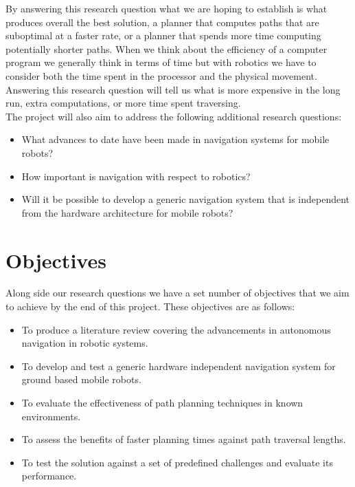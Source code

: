 \noindent
By answering this research question what we are hoping to establish is what produces overall the best solution, a planner that computes paths that are suboptimal at a faster rate, or a planner that spends more time computing potentially shorter paths. When we think about the efficiency of a computer program we generally think in terms of time but with robotics we have to consider both the time spent in the processor and the physical movement. Answering this research question will tell us what is more expensive in the long run, extra computations, or more time spent traversing. \\

\noindent
The project will also aim to address the following additional research questions:

\begin{itemize}
\item What advances to date have been made in navigation systems for mobile robots?

\item How important is navigation with respect to robotics?

\item Will it be possible to develop a generic navigation system that is independent from the hardware architecture for mobile robots?

\end{itemize}


\newpage

\section{Objectives}

\noindent
Along side our research questions we have a set number of objectives that we aim to achieve by the end of this project. These objectives are as follows:

\begin{itemize}
\item To produce a literature review covering the advancements in autonomous navigation in robotic systems.

\item To develop and test a generic hardware independent navigation system for ground based mobile robots. 

\item To evaluate the effectiveness of path planning techniques in known environments. 

\item To assess the benefits of faster planning times against path traversal lengths.

\item To test the solution against a set of predefined challenges and evaluate its performance.

\end{itemize}

